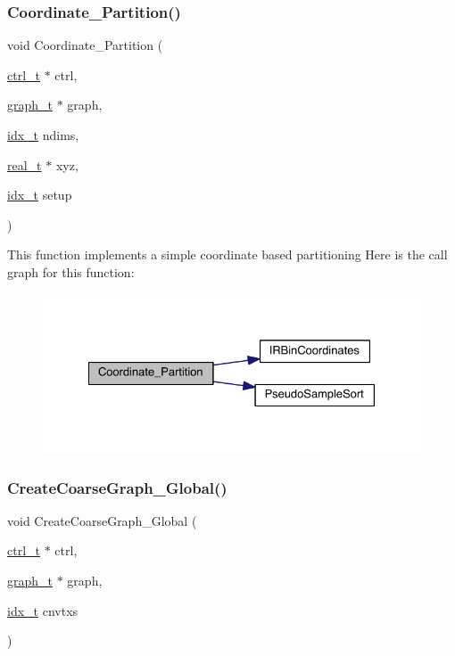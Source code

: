 \subsubsection{\texorpdfstring{Coordinate\+\_\+\+Partition()}{Coordinate\_Partition()}}
{\footnotesize\ttfamily void Coordinate\+\_\+\+Partition (\begin{DoxyParamCaption}\item[{\hyperlink{a00742}{ctrl\+\_\+t} $\ast$}]{ctrl,  }\item[{\hyperlink{a00734}{graph\+\_\+t} $\ast$}]{graph,  }\item[{\hyperlink{a00876_aaa5262be3e700770163401acb0150f52}{idx\+\_\+t}}]{ndims,  }\item[{\hyperlink{a00876_a1924a4f6907cc3833213aba1f07fcbe9}{real\+\_\+t} $\ast$}]{xyz,  }\item[{\hyperlink{a00876_aaa5262be3e700770163401acb0150f52}{idx\+\_\+t}}]{setup }\end{DoxyParamCaption})}

This function implements a simple coordinate based partitioning Here is the call graph for this function\+:\nopagebreak
\begin{figure}[H]
\begin{center}
\leavevmode
\includegraphics[width=328pt]{a00951_a609f294092e61b4b29d44fe278969e83_cgraph}
\end{center}
\end{figure}
\mbox{\label{a00951_add46f66d0e9d6c06e9bf36b386918c83}} 
\subsubsection{\texorpdfstring{Create\+Coarse\+Graph\+\_\+\+Global()}{CreateCoarseGraph\_Global()}}
{\footnotesize\ttfamily void Create\+Coarse\+Graph\+\_\+\+Global (\begin{DoxyParamCaption}\item[{\hyperlink{a00742}{ctrl\+\_\+t} $\ast$}]{ctrl,  }\item[{\hyperlink{a00734}{graph\+\_\+t} $\ast$}]{graph,  }\item[{\hyperlink{a00876_aaa5262be3e700770163401acb0150f52}{idx\+\_\+t}}]{cnvtxs }\end{DoxyParamCaption})}

